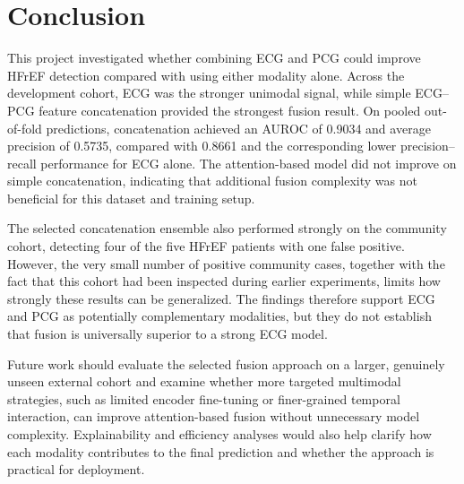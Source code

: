 \documentclass[11pt,a4paper]{article}
\begin{document}
\section{Conclusion}
\label{sec:conclusion}

This project investigated whether combining ECG and PCG could improve HFrEF
detection compared with using either modality alone. Across the development
cohort, ECG was the stronger unimodal signal, while simple ECG--PCG feature
concatenation provided the strongest fusion result. On pooled out-of-fold
predictions, concatenation achieved an AUROC of 0.9034 and average precision of
0.5735, compared with 0.8661 and the corresponding lower precision--recall
performance for ECG alone. The attention-based model did not improve on simple
concatenation, indicating that additional fusion complexity was not beneficial
for this dataset and training setup.

The selected concatenation ensemble also performed strongly on the community
cohort, detecting four of the five HFrEF patients with one false positive.
However, the very small number of positive community cases, together with the
fact that this cohort had been inspected during earlier experiments, limits how
strongly these results can be generalized. The findings therefore support ECG
and PCG as potentially complementary modalities, but they do not establish that
fusion is universally superior to a strong ECG model.

Future work should evaluate the selected fusion approach on a larger,
genuinely unseen external cohort and examine whether more targeted multimodal
strategies, such as limited encoder fine-tuning or finer-grained temporal
interaction, can improve attention-based fusion without unnecessary model
complexity. Explainability and efficiency analyses would also help clarify how
each modality contributes to the final prediction and whether the approach is
practical for deployment.
\end{document}
